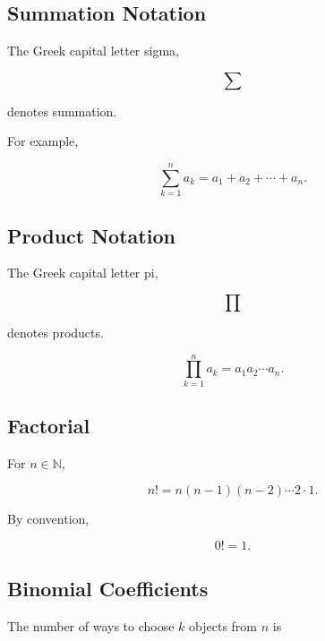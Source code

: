 \subsection{Summation Notation}
\label{subsec:summation-notation-reference}

The Greek capital letter sigma,

\[
\boxed{
\sum
}
\]

denotes summation.

For example,

\[
\boxed{
\sum_{k=1}^{n}a_k
=
a_1+a_2+\cdots+a_n.
}
\]

\subsection{Product Notation}
\label{subsec:product-notation-reference}

The Greek capital letter pi,

\[
\boxed{
\prod
}
\]

denotes products.

\[
\boxed{
\prod_{k=1}^{n}a_k
=
a_1a_2\cdots a_n.
}
\]

\subsection{Factorial}
\label{subsec:factorial-notation-reference}

For \(n\in\mathbb{N}\),

\[
\boxed{
n!
=
n(n-1)(n-2)\cdots2\cdot1.
}
\]

By convention,

\[
\boxed{
0!=1.
}
\]

\subsection{Binomial Coefficients}
\label{subsec:binomial-coefficient-notation-reference}

The number of ways to choose \(k\) objects from \(n\) is

